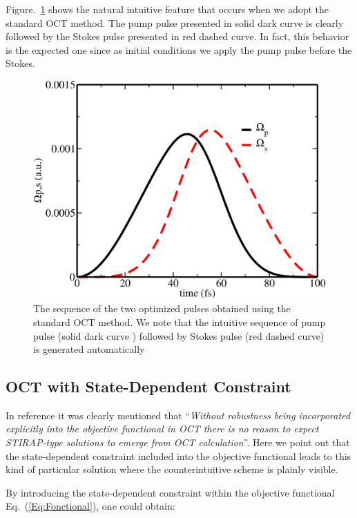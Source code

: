 \documentclass[]{interact}
\theoremstyle{plain}%
\theoremstyle{definition}
\theoremstyle{remark}
\begin{document}
Figure.~\ref{fig:Pulses-OCT-Standard} shows the natural intuitive feature 
that occurs when we adopt the standard OCT method. The pump pulse 
presented in solid dark curve is clearly followed by the Stokes pulse presented 
in red dashed curve. In fact, this behavior is the expected one since as 
initial 
conditions we apply the pump pulse before the Stokes.
\begin{figure}[h!] 
\centering
\includegraphics[width=0.7\linewidth]{Figure5}
\caption{The sequence of the two optimized pulses obtained 
using the standard OCT method. We note that the intuitive sequence 
of pump pulse (solid dark curve ) followed by Stokes pulse (red dashed curve) 
is generated automatically  
\label{fig:Pulses-OCT-Standard}}
\end{figure}
\subsection{OCT with State-Dependent Constraint}
In reference \cite{Tannor} it was clearly mentioned that  ``{\it Without 
robustness 
being incorporated explicitly into the objective functional in OCT there is no 
reason to expect STIRAP-type solutions to emerge from OCT calculation}''. 
Here we point out that the state-dependent constraint included into the 
objective functional \cite{Koch} leads to this kind of particular solution 
where the counterintuitive scheme is plainly visible. 

By introducing the state-dependent constraint within the objective 
functional Eq.~(\ref{Eq:Fonctional}), one could obtain:
\end{document}
